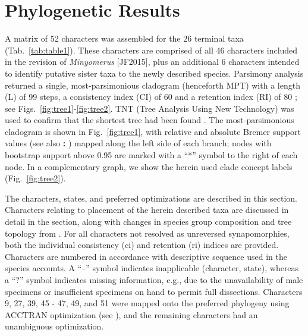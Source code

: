 \documentclass[fleqn,10pt,lineno]{wlpeerj} %
\begin{document}
\section*{Phylogenetic Results}\label{sec:results}
	A matrix of 52 characters was assembled for the 26 terminal taxa (Tab.~\ref{tab:table1}).
	These characters are comprised of all 46 characters included in the revision of \textit{Minyomerus} [JF2015], plus an additional 6 characters intended to identify putative sister taxa to the newly described species.
	Parsimony analysis returned a single, most-parsimonious cladogram (henceforth MPT) with a length (L) of 99 steps, a consistency index (CI) of 60 and a retention index (RI) of 80 \citep{farris1989}; see Figs.~\ref{fig:tree1}-\ref{fig:tree2}.
	TNT (Tree Analysis Using New Technology) was used to confirm that the shortest tree had been found \citep{goloboff2008}.
	The most-parsimonious cladogram is shown in Fig.~\ref{fig:tree1}, with relative and absolute Bremer support values (see also \textbf{: }) mapped along the left side of each branch; nodes with bootstrap support above 0.95 are marked with a ``*'' symbol to the right of each node. In a complementary graph, we show the herein used clade concept labels (Fig.~\ref{fig:tree2}).
	
	The characters, states, and preferred optimizations are described in this section.
	Characters relating to placement of the herein described taxa are discussed in detail in the \textbf{} section, along with changes in species group composition and tree topology from \citet{jansen2015}.
	 For all characters not resolved as unreversed synapomorphies, both the individual consistency (ci) and retention (ri) indices are provided.
	Characters are numbered in accordance with descriptive sequence used in the species accounts.
	A ``–'' symbol indicates inapplicable (character, state), whereas a ``?'' symbol indicates missing information, e.g., due to the unavailability of male specimens or insufficient specimens on hand to permit full dissections.
	Characters 9, 27, 39, 45 - 47, 49, and 51 were mapped onto the preferred phylogeny using ACCTRAN optimization (see \citealt{agnarsson2008}), and the remaining characters had an unambiguous optimization.
	
\end{document}
